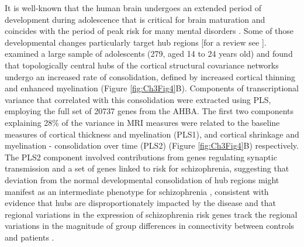It is well-known that the human brain undergoes an extended period of development during adolescence that is critical for brain maturation and coincides with the period of peak risk for many mental disorders \citep{Paus2008}. Some of those developmental changes particularly target hub regions \citep{Dennis2013,Hwang2013,Baker2015a} [for a review see \citep{Cao2016}].
\citet{Whitaker2016a} examined a large sample of adolescents (279, aged 14 to 24 years old) and found that topologically central hubs of the cortical structural covariance networks undergo an increased rate of consolidation, defined by increased cortical thinning and enhanced myelination (Figure \ref{fig:Ch3Fig4}B).
Components of transcriptional variance that correlated with this consolidation were extracted using PLS, employing the full set of \num{20737} genes from the AHBA. The first two components explaining 28\% of the variance in MRI measures were related to the baseline measures of cortical thickness and myelination (PLS1), and cortical shrinkage and myelination - consolidation over time (PLS2) (Figure \ref{fig:Ch3Fig4}B) respectively.
The PLS2 component involved contributions from genes regulating synaptic transmission and a set of genes linked to risk for schizophrenia, suggesting that deviation from the normal developmental consolidation of hub regions might manifest as an intermediate phenotype for schizophrenia \citep{Whitaker2016a}, consistent with evidence that hubs are disproportionately impacted by the disease \citep{VanDenHeuvel2013,Crossley2014,Klauser2016} and that regional variations in the expression of schizophrenia risk genes track the regional variations in the magnitude of group differences in connectivity between controls and patients \citep{Romme2017}.

